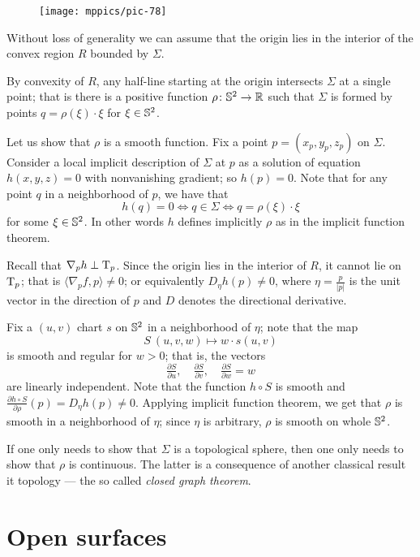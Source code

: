 \begin{wrapfigure}{O}{33 mm}
\vskip-0mm
\centering
\texttt{[image: mppics/pic-78]}
\vskip-0mm
\end{wrapfigure}

Without loss of generality we can assume that the origin lies in the interior of the convex region $R$ bounded by $\Sigma$.

By convexity of $R$, any half-line starting at the origin intersects $\Sigma$ at a single point;
that is there is a positive function $\rho\colon\mathbb{S}^2\to\mathbb{R}$ such that $\Sigma$ is formed by points $q=\rho(\xi)\cdot \xi$ for $\xi\in \mathbb{S}^2$.

Let us show that $\rho$ is a smooth function.
Fix a point $p=(x_p,y_p,z_p)$ on $\Sigma$.
Consider a local implicit description of $\Sigma$ at $p$ as a solution of equation $h(x,y,z)=0$ with nonvanishing gradient;
so $h(p)=0$.
Note that for any point $q$ in a neighborhood of $p$, we have that 
\[h(q)=0 \iff q\in \Sigma \iff q=\rho(\xi)\cdot\xi\] for some $\xi\in \mathbb{S}^2$.
In other words $h$ defines implicitly $\rho$ as in the implicit function theorem.



Recall that $\nabla_p h\perp \mathrm{T}_p$.
Since the origin lies in the interior of $R$, it cannot lie on $\mathrm{T}_p$;
that is $\langle\nabla_p f,p \rangle\ne0$;
or equivalently $D_\eta h(p)\ne 0$, where $\eta=\tfrac{p}{|p|}$ is the unit vector in the direction of $p$ and $D$ denotes the directional derivative.

Fix a $(u,v)$ chart $s$ on $\mathbb{S}^2$ in a neighborhood of $\eta$;
note that the map 
\[S\:(u,v,w)\mapsto w\cdot s(u,v)\] 
is smooth and regular for $w>0$; that is, the vectors 
\[\tfrac{\partial S}{\partial u},\quad \tfrac{\partial S}{\partial v},\quad  \tfrac{\partial S}{\partial w}=w\] are linearly independent.
Note that the function $h\circ S$ is smooth and
$\tfrac{\partial h\circ S}{\partial \rho}(p)=D_\eta h(p)\ne 0$.
Applying implicit function theorem, we get that $\rho$ is smooth in a neighborhood of $\eta$;
since $\eta$ is arbitrary, $\rho$ is smooth on whole $\mathbb{S}^2$.
\qeds


If one only needs to show that $\Sigma$ is a topological sphere, then one only needs to show that $\rho$ is continuous.
The latter is a consequence of another classical result it topology --- the so called \emph{closed graph theorem}.

\section*{Open surfaces}

